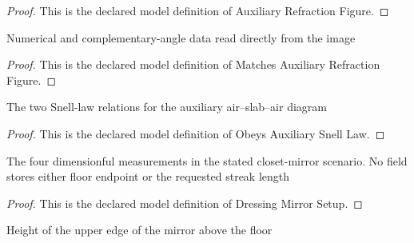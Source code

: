 \begin{proof}
  This is the declared model definition of Auxiliary Refraction Figure.
\end{proof}
\begin{definition}
  \label{def:physics:phyx-mini-0048:phyxminiproblems-problemphyxmini0048-matchesauxiliaryrefractionfigure}
  Numerical and complementary-angle data read directly from the image
\end{definition}
\begin{proof}
  This is the declared model definition of Matches Auxiliary Refraction Figure.
\end{proof}
\begin{definition}
  \label{def:physics:phyx-mini-0048:phyxminiproblems-problemphyxmini0048-obeysauxiliarysnelllaw}
  The two Snell-law relations for the auxiliary air--slab--air diagram
\end{definition}
\begin{proof}
  This is the declared model definition of Obeys Auxiliary Snell Law.
\end{proof}
\begin{definition}
  \label{def:physics:phyx-mini-0048:phyxminiproblems-problemphyxmini0048-dressingmirrorsetup}
  The four dimensionful measurements in the stated closet-mirror scenario. No field stores either floor endpoint or the requested streak length
\end{definition}
\begin{proof}
  This is the declared model definition of Dressing Mirror Setup.
\end{proof}
\begin{definition}
  \label{def:physics:phyx-mini-0048:phyxminiproblems-problemphyxmini0048-mirrortopheightabovefloor}
  Height of the upper edge of the mirror above the floor
\end{definition}
